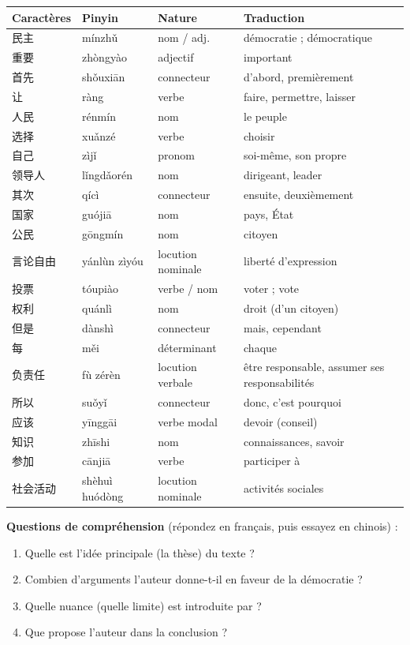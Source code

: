 \documentclass[11pt]{article}
\newcommand{\zh}[1]{\ifmmode\text{#1}\else{#1}\fi}
\begin{document}
\begin{center}
\begin{tabularx}{\linewidth}{|X|X|X|X|}
\hline
\rowcolor{popblueL} Caractères & Pinyin & Nature & Traduction \\
\hline
民主 & mínzhǔ & nom / adj. & démocratie ; démocratique \\
\hline
重要 & zhòngyào & adjectif & important \\
\hline
首先 & shǒuxiān & connecteur & d'abord, premièrement \\
\hline
让 & ràng & verbe & faire, permettre, laisser \\
\hline
人民 & rénmín & nom & le peuple \\
\hline
选择 & xuǎnzé & verbe & choisir \\
\hline
自己 & zìjǐ & pronom & soi-même, son propre \\
\hline
领导人 & lǐngdǎorén & nom & dirigeant, leader \\
\hline
其次 & qícì & connecteur & ensuite, deuxièmement \\
\hline
国家 & guójiā & nom & pays, État \\
\hline
公民 & gōngmín & nom & citoyen \\
\hline
言论自由 & yánlùn zìyóu & locution nominale & liberté d'expression \\
\hline
投票 & tóupiào & verbe / nom & voter ; vote \\
\hline
权利 & quánlì & nom & droit (d'un citoyen) \\
\hline
但是 & dànshì & connecteur & mais, cependant \\
\hline
每 & měi & déterminant & chaque \\
\hline
负责任 & fù zérèn & locution verbale & être responsable, assumer ses responsabilités \\
\hline
所以 & suǒyǐ & connecteur & donc, c'est pourquoi \\
\hline
应该 & yīnggāi & verbe modal & devoir (conseil) \\
\hline
知识 & zhīshi & nom & connaissances, savoir \\
\hline
参加 & cānjiā & verbe & participer à \\
\hline
社会活动 & shèhuì huódòng & locution nominale & activités sociales \\
\hline
\end{tabularx}
\end{center}

\textbf{Questions de compréhension} (répondez en français, puis essayez en chinois) :
\begin{enumerate}
\item Quelle est l'idée principale (la thèse) du texte ?
\item Combien d'arguments l'auteur donne-t-il en faveur de la démocratie ?
\item Quelle nuance (quelle limite) est introduite par \zh{但是} ?
\item Que propose l'auteur dans la conclusion ?
\end{enumerate}
\end{document}
